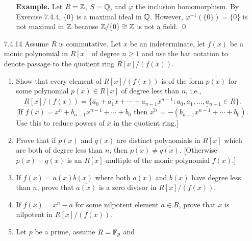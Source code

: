 \begin{enumerate}
\begin{enumerate}
               \textbf{Example.} Let $R = \mathbb{Z}$, $S = \mathbb{Q}$, and $\varphi$ the
               inclusion homomorphism. By Exercise 7.4.4, $\{0\}$ is a maximal
               ideal in $\mathbb{Q}$. However, $\varphi^{-1}(\{0\}) = \{0\}$ is not
               maximal in $\mathbb{Z}$ because $\mathbb{Z}/\{0\} \cong \mathbb{Z}$ is not a field. \qed
      \end{enumerate}
   \item[7.4.14]  Assume $R$ is commutative. Let $x$ be an indeterminate, let
                  $f(x)$ be a monic polynomial in $R[x]$ of degree $n \ge 1$ and
                  use the bar notation to denote passage to the quotient ring
                  $R[x]/(f(x))$.
                  \begin{enumerate}
                     \item Show that every element of $R[x]/(f(x))$ is of the
                           form $\overline{p(x)}$ for some polynomial
                           $p(x) \in R[x]$ of degree less than $n$, i.e.,
                           $$R[x]/(f(x)) = \{\overline{a_0} + \overline{a_1x}
                             + \cdots + \overline{a_{n-1}x^{n-1}} : a_0, a_1, 
                             \ldots, a_{n-1} \in R\}.$$
                           [If $f(x) = x^n + b_{n-1}x^{n-1} + \cdots + b_0$ then
                           $\overline{x^n}$ =
                           $\overline{-(b_{n-1}x^{n-1} + \cdots + b_0)}$. Use
                           this to reduce powers of $\overline{x}$ in the
                           quotient ring.]
                     \item Prove that if $p(x)$ and $q(x)$ are distinct
                           polynomials in $R[x]$ which are both of degree less
                           than $n$, then $\overline{p(x)} \neq\overline{q(x)}$.
                           [Otherwise $p(x) - q(x)$ is an $R[x]$-multiple of the
                           monic polynomial $f(x)$.]
                     \item If $f(x) = a(x)b(x)$ where both $a(x)$ and $b(x)$
                           have degree less than $n$, prove that
                           $\overline{a(x)}$ is a zero divisor in $R[x]/(f(x))$.
                     \item If $f(x) = x^n - a$ for some nilpotent element
                           $a \in R$, prove that $\overline{x}$ is nilpotent in
                           $R[x]/(f(x))$.
                     \item Let $p$ be a prime, assume $R = \mathbb{F}_p$ and

\end{enumerate}
\end{enumerate}
